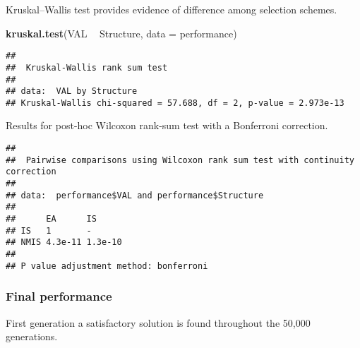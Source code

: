 \documentclass[]{book}
\newenvironment{Shaded}{\begin{snugshade}}{\end{snugshade}}
\newcommand{\DataTypeTok}[1]{\textcolor[rgb]{0.13,0.29,0.53}{#1}}
\newcommand{\KeywordTok}[1]{\textcolor[rgb]{0.13,0.29,0.53}{\textbf{#1}}}
\newcommand{\NormalTok}[1]{#1}
\newcommand{\OperatorTok}[1]{\textcolor[rgb]{0.81,0.36,0.00}{\textbf{#1}}}
\newcommand{\OtherTok}[1]{\textcolor[rgb]{0.56,0.35,0.01}{#1}}
\newcommand{\StringTok}[1]{\textcolor[rgb]{0.31,0.60,0.02}{#1}}
\begin{document}
Kruskal--Wallis test provides evidence of difference among selection schemes.

\begin{Shaded}
\begin{Highlighting}[]
\KeywordTok{kruskal.test}\NormalTok{(VAL }\OperatorTok{~}\StringTok{ }\NormalTok{Structure, }\DataTypeTok{data =}\NormalTok{ performance)}
\end{Highlighting}
\end{Shaded}

\begin{verbatim}
## 
##  Kruskal-Wallis rank sum test
## 
## data:  VAL by Structure
## Kruskal-Wallis chi-squared = 57.688, df = 2, p-value = 2.973e-13
\end{verbatim}

Results for post-hoc Wilcoxon rank-sum test with a Bonferroni correction.

\begin{Shaded}
\end{Shaded}

\begin{verbatim}
## 
##  Pairwise comparisons using Wilcoxon rank sum test with continuity correction 
## 
## data:  performance$VAL and performance$Structure 
## 
##      EA      IS     
## IS   1       -      
## NMIS 4.3e-11 1.3e-10
## 
## P value adjustment method: bonferroni
\end{verbatim}

\hypertarget{final-performance-1}{%
\subsubsection{Final performance}\label{final-performance-1}}

First generation a satisfactory solution is found throughout the 50,000 generations.
\end{document}
